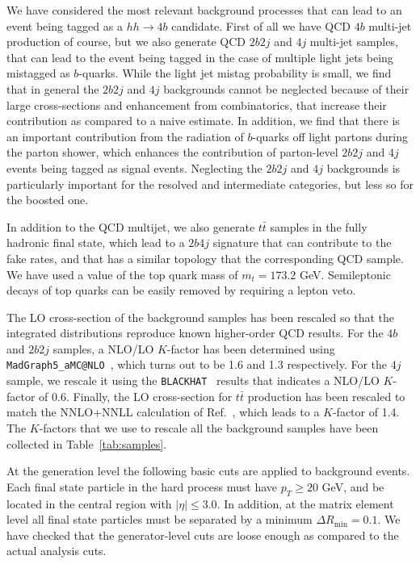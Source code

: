 We have considered the most relevant background
processes that can lead to an event
being tagged as a $hh\to 4b$ candidate.
%
First of all we have QCD $4b$ multi-jet production of course, but
we also generate QCD $2b2j$ and $4j$ multi-jet samples,
that can lead to the event being tagged in the case of multiple light
jets being mistagged as $b$-quarks.
%
While the light jet mistag probability is small, we find that
in general the $2b2j$ and $4j$ backgrounds cannot be neglected because
of their large cross-sections and enhancement from combinatorics, that
increase their contribution as compared to a naive estimate.
%
In addition, we find that there is an important contribution from the radiation
of $b$-quarks off light partons during the parton shower, which enhances the contribution
of parton-level $2b2j$ and $4j$ events being tagged as signal events.
%
Neglecting the  $2b2j$ and $4j$ backgrounds is particularly
important for the resolved and intermediate categories, but less
so for the boosted one.



In addition to the QCD multijet, we also generate $t\bar{t}$ samples
in the fully hadronic final state, which lead to a $2b4j$ signature that can
contribute to the fake rates, and that has a similar topology that
the corresponding QCD sample.
%
We have used a value of the top quark mass of $m_t=173.2$ GeV.
%
Semileptonic decays of top quarks can be easily removed by requiring
a lepton veto.

The LO cross-section of the background samples has been rescaled so that the integrated
distributions reproduce known higher-order QCD results.
%
For the $4b$ and $2b2j$ samples, a NLO/LO $K$-factor has been determined
using {\tt MadGraph5\_aMC@NLO}~\cite{Alwall:2014hca}, which turns out to be 1.6 and 1.3
respectively.
%
For the $4j$ sample, we rescale it using the {\tt BLACKHAT}~\cite{Bern:2011ep}
results that indicates
a NLO/LO $K$-factor of 0.6.
%
Finally, the LO cross-section for $t\bar{t}$ production has been rescaled
to match the NNLO+NNLL calculation of Ref.~\cite{Czakon:2013goa}, which leads
to a $K$-factor of 1.4.
%
The $K$-factors that we use to rescale all the background samples have been collected in
Table~\ref{tab:samples}.


At the generation level the following basic cuts are applied to
background events.
%
Each final state particle in the hard process must have $p_T \ge 20$ GeV, and be located
in the central region with
$| \eta | \le 3.0$.
%
In addition, at the matrix element level
all final state particles must be separated by a minimum $\Delta R_{\mathrm{min}} =0.1$.
%
We have checked that the generator-level cuts are loose enough as compared to the actual
analysis cuts.
%


